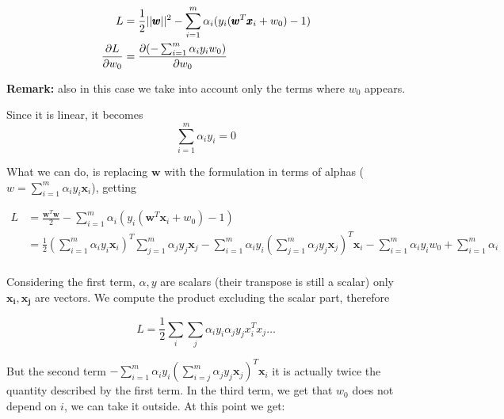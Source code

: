             \begin{align*}
                L &= \frac{1}{2} ||\pmb{w}||^2 - 
                    \sum_{i=1}^m \alpha_i (y_i (\pmb{w}^T \pmb{x}_i + w_0) - 1)\\
                \pdv{L} {w_0} &= \pdv{(- \sum_{i=1}^m \alpha_i y_i w_0)}{w_0}\\
            \end{align*}
            
            \textbf{Remark:} also in this case we take into account only the terms where $w_0$ appears. \newline
            
            Since it is linear, it becomes
            \begin{equation}
                \sum_{i=1}^m \alpha_i y_i = 0
                \label{ref:second important result}
            \end{equation}

            What we can do, is replacing $\pmb{w}$ with the formulation in terms of alphas ($w = \sum_{i=1}^m \alpha_i y_i \pmb{x}_i$), getting

            \begin{align*}
                L &= \frac{\pmb{w}^T \pmb{w}}{2}  - 
                    \sum_{i=1}^m \alpha_i (y_i (\pmb{w}^T \pmb{x}_i + w_0) - 1)\\
                & = \frac{1}{2} \left( \sum_{i=1}^m \alpha_i y_i \pmb{x}_i \right)^T {\sum_{j=1}^m \alpha_j y_j \pmb{x}_j}  - 
                    \sum_{i=1}^m \alpha_i y_i (\sum_{j=1}^m \alpha_j y_j \pmb{x}_j)^T \pmb{x}_i - \sum_{i=1}^m \alpha_i y_i w_0 + \sum_{i=1}^m \alpha_i \\
            \end{align*}
            
            Considering the first term,  $\alpha, y$ are scalars (their transpose is still a scalar) only $\pmb{x_i}, \pmb{x_j}$ are vectors. 
            We compute the product excluding the scalar part, therefore
            
            $$L = \frac{1}{2} \sum_{i} \sum_{j} \alpha_i y_i \alpha_j y_j x_i ^T x_j \dots$$
            
            But the second term $ -\sum_{i=1}^m \alpha_i y_i (\sum_{i=j}^m \alpha_j y_j \pmb{x}_j)^T \pmb{x}_i$ it is actually twice the quantity described by the first term.
            In the third term, we get that $w_0$ does not depend on $i$, we can take it outside.
            At this point we get:
            

